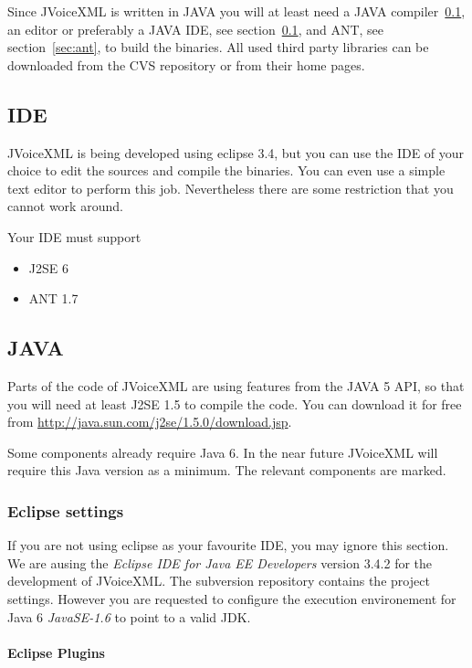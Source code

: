 \documentclass[11pt,a4paper]{article}
\begin{document}
Since JVoiceXML is written in JAVA you will at least need a
JAVA compiler~\ref{sec:ide}, an editor or preferably a JAVA
IDE, see section~\ref{sec:ide}, and ANT, see section~\ref{sec:ant}, to build the
binaries. All used third party libraries can be downloaded from the CVS 
repository or from their home pages.


\subsection{IDE}
\label{sec:ide}

JVoiceXML is being developed using eclipse 3.4, but you can use the IDE of your
choice to edit the sources and compile the binaries. You can even use a simple
text editor to perform this job. Nevertheless there are some restriction that
you cannot work around.

Your IDE must support

\begin{itemize}
\item J2SE 6
\item ANT 1.7
\end{itemize}

\subsection{JAVA}
\label{sec:java}

Parts of the code of JVoiceXML are using features from the JAVA 5 API, so that
you will need at least J2SE 1.5 to compile the code. You can download it
for free from \url{http://java.sun.com/j2se/1.5.0/download.jsp}.

Some components already require Java 6. In the near future JVoiceXML will
require this Java version as a minimum. The relevant components are marked. 

\subsubsection{Eclipse settings}
\label{sec:eclipse}

If you are not using eclipse as your favourite IDE, you may ignore this section.
We are ausing the \emph{Eclipse IDE for Java EE Developers} version 3.4.2 for
the development of JVoiceXML. The subversion repository contains the
project settings. However you are requested to configure the execution
environement for Java 6 \emph{JavaSE-1.6} to point to a valid JDK.

\paragraph{Eclipse Plugins}
\end{document}
